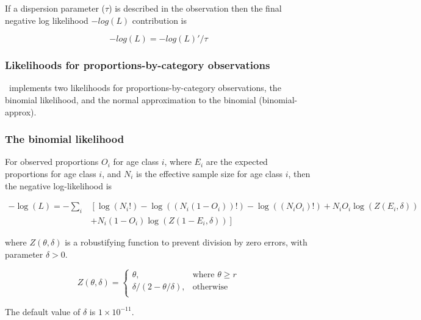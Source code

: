 If a dispersion parameter ($\tau$) is described in the observation then the final negative log likelihood $-log(L)$ contribution is

$$-log(L) = -log(L)' / \tau$$

\subsubsection{Likelihoods for proportions-by-category observations}

\CNAME\ implements two likelihoods for proportions-by-category observations, the binomial likelihood, and the normal approximation to the binomial (binomial-approx).

\subsubsection*{The binomial likelihood}

For observed proportions $O_i$ for age class $i$, where $E_i$ are the expected proportions for age class $i$, and $N_i$ is the effective sample size for age class $i$, then the negative log-likelihood is

\begin{equation}
\begin{split}
-\log \left(L \right)= -\sum\limits_i & \left[ \right. \log \left(N_i! \right) - \log \left(\left(N_i \left(1 - O_i \right) \right)! \right) - \log \left(\left(N_i O_i \right)! \right) + N_i O_i \log \left(Z\left(E_i,\delta \right) \right) \\
&+ N_i \left(1 - O_i \right)\log \left(Z\left(1 - E_i,\delta\right) \right) \left. \right]
\end{split}
\end{equation}

where $Z \left(\theta,\delta \right)$ is a robustifying function to prevent division by zero errors, with parameter $\delta>0$.

\begin{equation}
Z \left(\theta,\delta \right) = \begin{cases}
\theta, & \text{where $\theta \ge r$} \\
\delta/\left( 2-\theta/\delta \right), & \text{otherwise} \\
\end{cases}
\end{equation}

The default value of $\delta$ is $1 \times 10^{-11}$.

